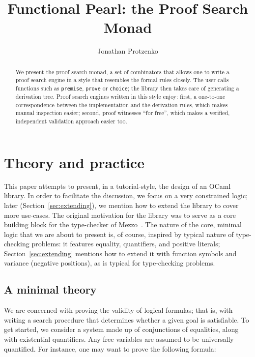 \documentclass{easychair}
\def\li{\lstinline}
\newcommand{\sref}[1]{Section~\ref{sec:#1}}
\begin{document}
\title{Functional Pearl: the Proof Search Monad}

\author{Jonathan Protzenko}

\maketitle

\begin{abstract}
  We present the proof search monad, a set of combinators that allows one to
  write a proof search engine in a style that resembles the formal rules
  closely. The user calls functions such as \li+premise+, \li+prove+ or
  \li+choice+; the library then takes care of generating a derivation tree.
  Proof search engines written in this style enjoy: first, a one-to-one
  correspondence between the implementation and the derivation rules, which
  makes manual inspection easier; second, proof witnesses ``for free'', which
  makes a verified, independent validation approach easier too.
\end{abstract}

\section{Theory and practice}
\label{sec:intro}

This paper attempts to present, in a tutorial-style, the design of an OCaml
library. In order to facilitate the discussion, we focus on a very constrained
logic; later (\sref{extending}), we mention how to extend the library to
cover more use-cases. The original motivation for the library was to serve as a
core building block for the type-checker of Mezzo~\cite{protzenko-phd-14}. The
nature of the core, minimal logic that we are about to present is, of course,
inspired by typical nature of type-checking problems: it features equality,
quantifiers, and positive literals; \sref{extending} mentions how to extend it
with function symbols and variance (negative positions), as is typical for
type-checking problems.

\subsection{A minimal theory}

We are concerned with proving the validity of logical formulas; that is, with
writing a search procedure that determines whether a given goal is satisfiable.
To get started, we consider a system made up of conjunctions of equalities,
along with existential quantifiers. Any free variables are assumed to be
universally quantified. For instance, one may want to prove the following
formula:
\end{document}
